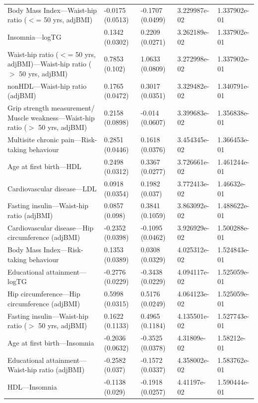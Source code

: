 \documentclass{article}\usepackage[]{graphicx}\usepackage[dvipsnames]{xcolor}
\begin{document}
\begin{longtable}{p{6cm}|p{1.5cm}|p{1.5cm}|p{1.5cm}}
  Body Mass Index---Waist-hip ratio ($<$= 50 yrs, adjBMI) & -0.0175 (0.0513) & -0.1707 (0.0499) & 3.229987e-02 & 1.337902e-01 \\ 
  Insomnia---logTG & 0.1342 (0.0302) & 0.2209 (0.0271) & 3.262189e-02 & 1.337902e-01 \\ 
  Waist-hip ratio ($<$= 50 yrs, adjBMI)---Waist-hip ratio ($>$ 50 yrs, adjBMI) & 0.7853 (0.102) & 1.0633 (0.0809) & 3.272998e-02 & 1.337902e-01 \\ 
  nonHDL---Waist-hip ratio (adjBMI) & 0.1765 (0.0472) & 0.3017 (0.0351) & 3.329482e-02 & 1.340791e-01 \\ 
  Grip strength measurement/ Muscle weakness---Waist-hip ratio ($>$ 50 yrs, adjBMI) & 0.2158 (0.0898) & -0.014 (0.0607) & 3.399683e-02 & 1.356838e-01 \\ 
  Multisite chronic pain---Risk-taking behaviour & 0.2851 (0.0446) & 0.1618 (0.0376) & 3.454345e-02 & 1.366453e-01 \\ 
  Age at first birth---HDL & 0.2498 (0.0312) & 0.3367 (0.0277) & 3.726661e-02 & 1.461244e-01 \\ 
  Cardiovascular disease---LDL & 0.0918 (0.0354) & 0.1982 (0.037) & 3.772413e-02 & 1.46632e-01 \\ 
  Fasting insulin---Waist-hip ratio (adjBMI) & 0.0857 (0.098) & 0.3841 (0.1059) & 3.863092e-02 & 1.488622e-01 \\ 
  Cardiovascular disease---Hip circumference (adjBMI) & -0.2352 (0.0398) & -0.1095 (0.0462) & 3.926929e-02 & 1.500288e-01 \\ 
  Body Mass Index---Risk-taking behaviour & 0.1353 (0.0389) & 0.0308 (0.0329) & 4.025312e-02 & 1.524843e-01 \\ 
  Educational attainment---logTG & -0.2776 (0.0229) & -0.3438 (0.0229) & 4.094117e-02 & 1.525059e-01 \\ 
  Hip circumference---Hip circumference (adjBMI) & 0.5998 (0.0315) & 0.5176 (0.0249) & 4.064123e-02 & 1.525059e-01 \\ 
  Fasting insulin---Waist-hip ratio ($>$ 50 yrs, adjBMI) & 0.1622 (0.1133) & 0.4965 (0.1184) & 4.135501e-02 & 1.527743e-01 \\ 
  Age at first birth---Insomnia & -0.2036 (0.0632) & -0.3525 (0.0378) & 4.31809e-02 & 1.58212e-01 \\ 
  Educational attainment---Waist-hip ratio (adjBMI) & -0.2582 (0.037) & -0.1572 (0.0337) & 4.358002e-02 & 1.583762e-01 \\ 
  HDL---Insomnia & -0.1138 (0.029) & -0.1918 (0.0257) & 4.41197e-02 & 1.590444e-01 \\ 

\end{longtable}
\end{document}

